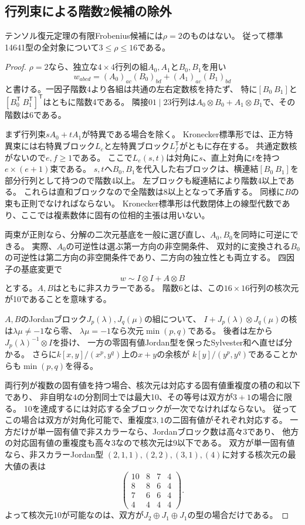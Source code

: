 \subsection{行列束による階数2候補の除外}
\begin{proposition}\label{prop:no-opposite-rank-two}
テンソル復元定理の有限Frobenius候補には$\rho=2$のものはない。
従って標準14641型の全対象について$3\leq\rho\leq16$である。
\end{proposition}
\begin{proof}
$\rho=2$なら、独立な$4\times4$行列の組$A_0,A_1$と$B_0,B_1$を用い
\[
 w_{abcd}=(A_0)_{ac}(B_0)_{bd}+(A_1)_{ac}(B_1)_{bd}
\]
と書ける。一因子階数4より各組は共通の左右定数核を持たず、
特に$[B_0\ B_1]$と$[B_0^{\mathsf T}\ B_1^{\mathsf T}]^{\mathsf T}$はともに階数4である。
隣接$01\mid23$行列は$A_0\otimes B_0+A_1\otimes B_1$で、その階数は6である。

まず行列束$sA_0+tA_1$が特異である場合を除く。
Kronecker標準形\cite[Theorem 1]{DDLpencils}では、正方特異束には右特異ブロック$L_e$と左特異ブロック$L_f^{\mathsf T}$がともに存在する。
共通定数核がないので$e,f\geq1$である。
ここで$L_e(s,t)$は対角に$s$、直上対角に$t$を持つ$e\times(e+1)$束である。
$s,t$へ$B_0,B_1$を代入した右ブロックは、横連結$[B_0\ B_1]$を部分行列として持つので階数4以上。
左ブロックも縦連結により階数4以上である。
これらは直和ブロックなので全階数は8以上となって矛盾する。
同様に$B$の束も正則でなければならない。
Kronecker標準形は代数閉体上の線型代数であり、ここでは複素数体に固有の位相的主張は用いない。

両束が正則なら、分解の二次元基底を一般に選び直し、$A_0,B_0$を同時に可逆にできる。
実際、$A_0$の可逆性は選ぶ第一方向の非空開条件、
双対的に変換される$B_0$の可逆性は第二方向の非空開条件であり、二方向の独立性とも両立する。
四因子の基底変更で
\[
 w\sim I\otimes I+A\otimes B
\]
とする。$A,B$はともに非スカラーである。
階数6とは、この$16\times16$行列の核次元が10であることを意味する。

$A,B$のJordanブロック$J_p(\lambda),J_q(\mu)$の組について、
$I+J_p(\lambda)\otimes J_q(\mu)$の核は$\lambda\mu\ne-1$なら零、
$\lambda\mu=-1$なら次元$\min(p,q)$である。
後者は左から$J_p(\lambda)^{-1}\otimes I$を掛け、
一方の零固有値Jordan型を保ったSylvester和へ直せば分かる。
さらに$k[x,y]/(x^p,y^q)$上の$x+y$の余核が
$k[y]/(y^p,y^q)$であることからも$\min(p,q)$を得る。

両行列が複数の固有値を持つ場合、核次元は対応する固有値重複度の積の和以下であり、
非自明な4の分割同士では最大10、その等号は双方が$3+1$の場合に限る。
10を達成するには対応する全ブロックが一次でなければならない。
従ってこの場合は双方が対角化可能で、重複度$3,1$の二固有値がそれぞれ対応する。
一方だけが単一固有値で非スカラーなら、Jordanブロック数は高々3であり、
他方の対応固有値の重複度も高々3なので核次元は9以下である。
双方が単一固有値なら、非スカラーJordan型
$(2,1,1),(2,2),(3,1),(4)$に対する核次元の最大値の表は
\[
 \begin{pmatrix}10&8&7&4\\8&8&6&4\\7&6&6&4\\4&4&4&4\end{pmatrix}.
\]
よって核次元10が可能なのは、双方が$J_2\oplus J_1\oplus J_1$の型の場合だけである。


\end{proof}
